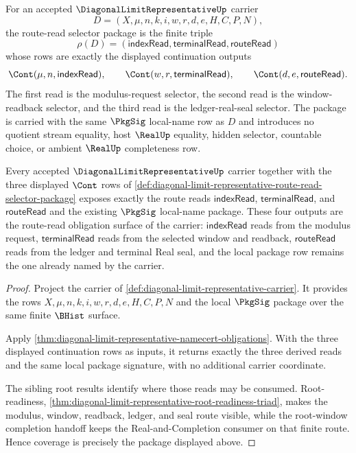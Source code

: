 \begin{definition}
\label{def:diagonal-limit-representative-route-read-selector-package}
For an accepted $\DiagonalLimitRepresentativeUp$ carrier
$$
D=(X,\mu,n,k,i,w,r,d,e,H,C,P,N),
$$
the route-read selector package is the finite triple
$$
\rho(D)=(\mathsf{indexRead},\mathsf{terminalRead},\mathsf{routeRead})
$$
whose rows are exactly the displayed continuation outputs
$$
\Cont(\mu,n,\mathsf{indexRead}),\qquad
\Cont(w,r,\mathsf{terminalRead}),\qquad
\Cont(d,e,\mathsf{routeRead}).
$$
The first read is the modulus-request selector, the second read is the window-readback selector, and the third read is the ledger-real-seal selector. The package is carried with the same $\PkgSig$ local-name row as $D$ and introduces no quotient stream equality, host $\RealUp$ equality, hidden selector, countable choice, or ambient $\RealUp$ completeness row.
\end{definition}

\begin{theorem}
\label{thm:diagonal-limit-representative-route-read-coverage}
Every accepted $\DiagonalLimitRepresentativeUp$ carrier together with the three displayed $\Cont$ rows of \autoref{def:diagonal-limit-representative-route-read-selector-package} exposes exactly the route reads $\mathsf{indexRead}$, $\mathsf{terminalRead}$, and $\mathsf{routeRead}$ and the existing $\PkgSig$ local-name package. These four outputs are the route-read obligation surface of the carrier: $\mathsf{indexRead}$ reads from the modulus request, $\mathsf{terminalRead}$ reads from the selected window and readback, $\mathsf{routeRead}$ reads from the ledger and terminal Real seal, and the local package row remains the one already named by the carrier.
\end{theorem}
\begin{proof}
Project the carrier of \autoref{def:diagonal-limit-representative-carrier}. It provides the rows $X,\mu,n,k,i,w,r,d,e,H,C,P,N$ and the local $\PkgSig$ package over the same finite $\BHist$ surface.

Apply \autoref{thm:diagonal-limit-representative-namecert-obligations}. With the three displayed continuation rows as inputs, it returns exactly the three derived reads and the same local package signature, with no additional carrier coordinate.

The sibling root results identify where those reads may be consumed. Root-readiness, \autoref{thm:diagonal-limit-representative-root-readiness-triad}, makes the modulus, window, readback, ledger, and seal route visible, while the root-window completion handoff keeps the Real-and-Completion consumer on that finite route. Hence coverage is precisely the package displayed above.
\end{proof}

